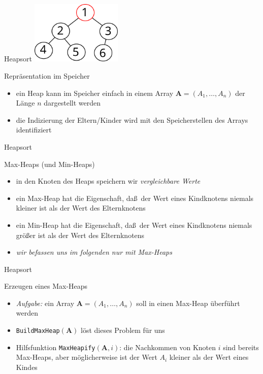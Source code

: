 \documentclass[aspectratio=1610, 11pt]{beamer}
\renewcommand{\vec}[1]{\boldsymbol{#1}}
\newcommand\vA{\vec A}
\begin{document}
\begin{frame}{Heapsort}
	\hfill\includegraphics[height=30mm]{./images/heap.pdf}
	\begin{exampleblock}{Repr\"asentation im Speicher}
		\begin{itemize}
			\item ein Heap kann im Speicher einfach in einem \alert{Array} $\vA=(A_1,\ldots,A_n)$ der L\"ange $n$ dargestellt werden
			\item die Indizierung der Eltern/Kinder wird mit den Speicherstellen des Arrays identifiziert
		\end{itemize}
	\end{exampleblock}
\end{frame}

\begin{frame}{Heapsort}
	\begin{exampleblock}{Max-Heaps (und Min-Heaps)}
		\begin{itemize}
			\item in den Knoten des Heaps speichern wir \emph{vergleichbare Werte}
			\item ein \alert{Max-Heap} hat die Eigenschaft, da\ss\ der Wert eines Kindknotens niemals kleiner ist als der Wert des Elternknotens
			\item ein \alert{Min-Heap} hat die Eigenschaft, da\ss\ der Wert eines Kindknotens niemals gr\"o\ss er ist als der Wert des Elternknotens
			\item \emph{wir befassen uns im folgenden nur mit Max-Heaps}
		\end{itemize}
	\end{exampleblock}
\end{frame}

\begin{frame}{Heapsort}
	\begin{exampleblock}{Erzeugen eines Max-Heaps}
		\begin{itemize}
			\item \emph{Aufgabe:} ein Array $\vA=(A_1,\ldots,A_n)$ soll in einen Max-Heap \"uberf\"uhrt werden
			\item {\tt BuildMaxHeap}$(\vA)$ l\"ost dieses Problem f\"ur uns
			\item Hilfsfunktion {\tt MaxHeapify}$(\vA,i)$: die Nachkommen von Knoten $i$ sind bereits Max-Heaps, aber m\"oglicherweise ist der Wert $A_i$ kleiner als der Wert eines Kindes
		\end{itemize}
	\end{exampleblock}
\end{frame}
\end{document}

